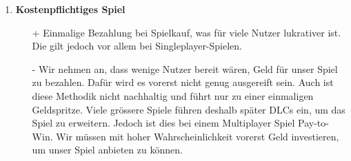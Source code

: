 \begin{itemize}
\begin{enumerate}
        \item \textbf{Kostenpflichtiges Spiel}
        \begin{itemize}
            \item[+] Einmalige Bezahlung bei Spielkauf, was für viele Nutzer lukrativer ist. Die gilt jedoch vor allem bei Singleplayer-Spielen.
            \item[-] Wir nehmen an, dass wenige Nutzer bereit wären, Geld für unser Spiel zu bezahlen.
                    Dafür wird es vorerst nicht genug ausgereift sein.
                    Auch ist diese Methodik nicht nachhaltig und führt nur zu einer einmaligen Geldspritze.
                    Viele grössere Spiele führen deshalb später
                    DLCs ein, um das Spiel zu erweitern.
                    Jedoch ist dies bei einem Multiplayer Spiel Pay-to-Win.
                    Wir müssen mit hoher Wahrscheinlichkeit vorerst Geld investieren, um unser Spiel anbieten zu können.
        \end{itemize}
    \end{enumerate}
\end{itemize}

